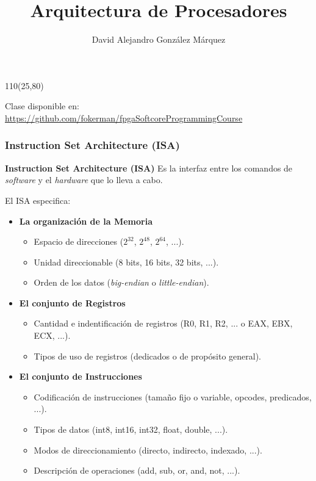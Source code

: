 \documentclass[aspectratio=169]{beamer}
\title{\Huge Arquitectura de Procesadores}
\author{David Alejandro González Márquez}
\date{}
\begin{document}
\begin{frame}[plain]
    \titlepage
    \begin{textblock}{110}(25,80)
    \begin{tcolorbox}[size=small,width=\textwidth,colback={gray!30},title={}]
    \begin{center}
     \scriptsize Clase disponible en: \url{https://github.com/fokerman/fpgaSoftcoreProgrammingCourse}
    \end{center}
    \end{tcolorbox}
    \end{textblock}
\end{frame}

\begin{frame}[t,fragile]
    \frametitle{Instruction Set Architecture (ISA)}
    \begin{block}{\textbf{Instruction Set Architecture (ISA)}}
    Es la interfaz entre los comandos de \emph{software} y el \emph{hardware} que lo lleva a cabo.
    \end{block}
    \pause
    El ISA especifica:
    \begin{itemize}
    \item<3-> \textbf{La organización de la Memoria}
      \begin{itemize}
       \item Espacio de direcciones ($2^{32}$, $2^{48}$, $2^{64}$, ...).
       \item Unidad direccionable (8 bits, 16 bits, 32 bits, ...).
       \item Orden de los datos (\emph{big-endian} o \emph{little-endian}).
      \end{itemize}
    \item<4-> \textbf{El conjunto de Registros}
    \begin{itemize}
     \item Cantidad e indentificación de registros (R0, R1, R2, ... o EAX, EBX, ECX, ...).
     \item Tipos de uso de registros (dedicados o de propósito general).
    \end{itemize}
    \item<5-> \textbf{El conjunto de Instrucciones}
    \begin{itemize}
     \item Codificación de instrucciones (tamaño fijo o variable, opcodes, predicados, ...).
     \item Tipos de datos (int8, int16, int32, float, double, ...).
     \item Modos de direccionamiento (directo, indirecto, indexado, ...).
     \item Descripción de operaciones (add, sub, or, and, not, ...).
    \end{itemize}
    \end{itemize}
\end{frame}
\end{document}

